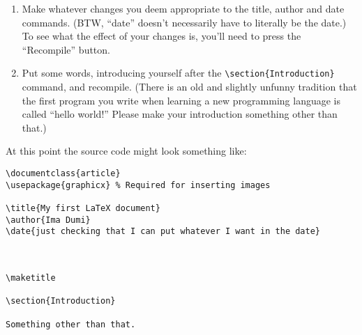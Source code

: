 \begin{enumerate}
You should see your document on the right side. It has a title section (which is 
what the \verb+\maketitle+ command created) and a section heading (this is what the \verb+\section{Introduction}+ command did). Scroll down to the bottom of the page and you
will see the number 1, the page number. Pages of articles are normally
numbered, so \LaTeX\  puts that in for you!  The area
between the \verb+\documentclass{article}+ and
the \verb++ tags is known
as the \textbf{preamble} of the \LaTeX\  document. 
You should see that the preamble contains some commands that effect how the title looks.  
The default stuff that Overleaf stuck in there probably isn't quite what you want.

Let's fix that!


\item Make whatever changes you deem appropriate to the title, author and date commands. (BTW, ``date'' doesn't necessarily have to literally be the date.)  To see what the effect of your changes is, you'll need to press the ``Recompile'' button.

\item Put some words, introducing yourself after the \verb+\section{Introduction}+ command, and recompile. (There is an old and slightly unfunny tradition that the first program you write when learning a new programming language is called ``hello world!''  Please make your introduction something other than that.)
\setcounter{interitemtemp}{\value{enumi}}
\end{enumerate}

At this point the source code might look something like:
\bigskip

\begin{codeblock}
\begin{verbatim}
\documentclass{article}
\usepackage{graphicx} % Required for inserting images

\title{My first LaTeX document}
\author{Ima Dumi}
\date{just checking that I can put whatever I want in the date}



\maketitle

\section{Introduction}

Something other than that.


\end{verbatim}
\end{codeblock}

